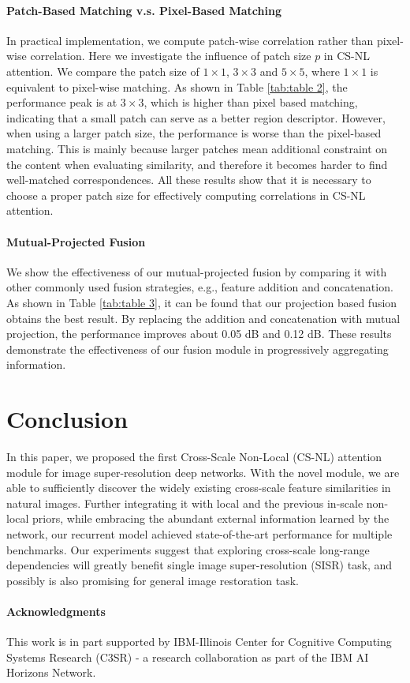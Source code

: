 \documentclass[10pt,twocolumn,letterpaper]{article}
\begin{document}
\paragraph{Patch-Based Matching v.s. Pixel-Based Matching} In practical implementation, we compute patch-wise correlation rather than pixel-wise correlation. Here we investigate the influence of patch size $p$ in CS-NL attention. We compare the patch size of $1\times 1$, $3\times 3$ and $5\times 5$, where $1\times 1$ is equivalent to pixel-wise matching. As shown in Table \ref{tab:table 2}, the performance peak is at $3\times 3$, which is higher than pixel based matching, indicating that a small patch can serve as a better region descriptor. However, when using a larger patch size, the performance is worse than the pixel-based matching. This is mainly because larger patches mean additional constraint on the content when evaluating similarity, and therefore it becomes harder to find well-matched correspondences. All these results show that it is necessary to choose a proper patch size for effectively computing correlations in CS-NL attention.

\paragraph{Mutual-Projected Fusion} We show the effectiveness of our mutual-projected fusion by comparing it with other commonly used fusion strategies, e.g., feature addition and concatenation. As shown in Table \ref{tab:table 3}, it can be found that our projection based fusion obtains the best result. By replacing the addition and concatenation with mutual projection, the performance improves about 0.05 dB and 0.12 dB. These results demonstrate the effectiveness of our fusion module in progressively aggregating information. 



 \section{Conclusion}
In this paper, we proposed the first Cross-Scale Non-Local (CS-NL) attention module for image super-resolution deep networks. With the novel module, we are able to sufficiently discover the widely existing cross-scale feature similarities in natural images. Further integrating it with local and the previous in-scale non-local priors, while embracing the abundant external information learned by the network, our recurrent model achieved state-of-the-art performance for multiple benchmarks. Our experiments suggest that exploring cross-scale long-range dependencies will greatly benefit single image super-resolution (SISR) task, and possibly is also promising for general image restoration task.  
\paragraph{Acknowledgments}
This work is in part supported by IBM-Illinois Center for Cognitive Computing Systems Research (C3SR) - a research collaboration as part of the IBM AI Horizons Network.


{\small


}
\end{document}

